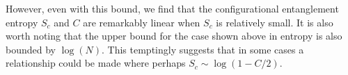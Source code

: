 However, even with this bound, we find that the configurational entanglement entropy $S_c$ and $C$ are remarkably linear when $S_c$ is relatively small. It is also worth noting that the upper bound for the case shown above in entropy is also bounded by $\log(N)$. This temptingly suggests that in some cases a relationship could be made where perhaps $S_c \sim \log(1-C/2)$.


%
